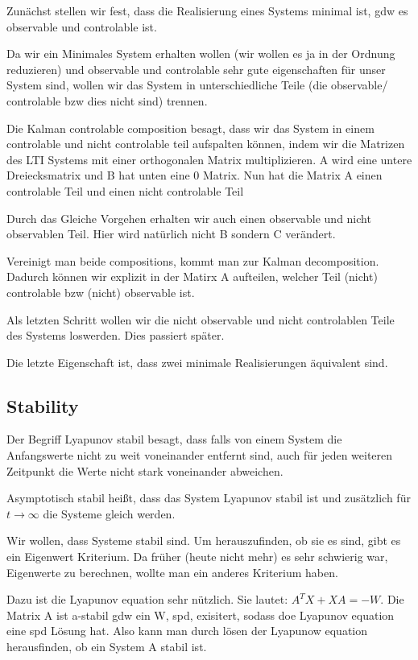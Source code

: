 \documentclass[]{article}
\begin{document}
Zunächst stellen wir fest, dass die Realisierung eines Systems minimal ist, gdw es observable und controlable ist. 

Da wir ein Minimales System erhalten wollen (wir wollen es ja in der Ordnung reduzieren) und observable und controlable sehr gute eigenschaften für unser System sind, wollen wir das System in unterschiedliche Teile (die observable/ controlable bzw dies nicht sind) trennen. 

Die Kalman controlable composition besagt, dass wir das System in einem controlable und nicht controlable teil aufspalten können, indem wir die Matrizen des LTI Systems mit einer orthogonalen Matrix multiplizieren. A wird eine untere Dreiecksmatrix und B hat unten eine 0 Matrix. Nun hat die Matrix A einen controlable Teil und einen nicht controlable Teil

Durch das Gleiche Vorgehen erhalten wir auch einen observable und nicht observablen Teil. Hier wird natürlich nicht B sondern C verändert. 

Vereinigt man beide compositions, kommt man zur Kalman decomposition. Dadurch können wir explizit in der Matirx A aufteilen, welcher Teil (nicht) controlable bzw (nicht) observable ist. 

Als letzten Schritt wollen wir die nicht observable und nicht controlablen Teile des Systems loswerden. Dies passiert später. 

Die letzte Eigenschaft ist, dass zwei minimale Realisierungen äquivalent sind. 

\subsection{Stability}
 Der Begriff Lyapunov stabil besagt, dass falls von einem System die Anfangswerte nicht zu weit voneinander entfernt sind, auch für jeden weiteren Zeitpunkt die Werte nicht stark voneinander abweichen. 
 
 Asymptotisch stabil heißt, dass das System Lyapunov stabil ist und zusätzlich für $ t \rightarrow \infty$
 die Systeme gleich werden. 
 
 Wir wollen, dass Systeme stabil sind. Um herauszufinden, ob sie es sind, gibt es ein Eigenwert Kriterium. Da früher (heute nicht mehr) es sehr schwierig war, Eigenwerte zu berechnen, wollte man ein anderes Kriterium haben.
 
 Dazu ist die Lyapunov equation sehr nützlich. Sie lautet: $A^T X + XA = -W$. Die Matrix A ist a-stabil gdw ein W, spd, exisitert, sodass doe Lyapunov equation eine spd Lösung hat. Also kann man durch lösen der Lyapunow equation herausfinden, ob ein System A stabil ist.
 
\end{document}
